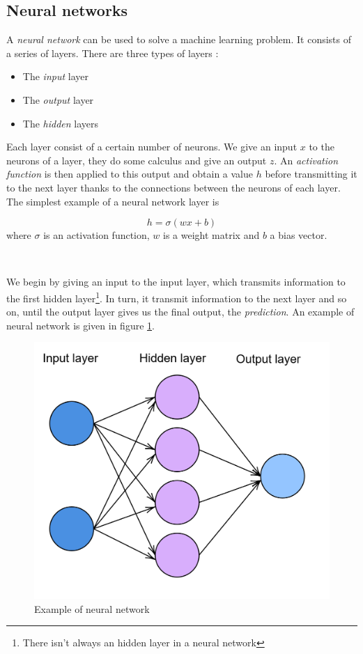 \documentclass[10pt,a4paper]{article}
\theoremstyle{definition}
\theoremstyle{definition}
\theoremstyle{definition}
\begin{document}
\subsection{Neural networks}


\noindent A \textit{neural network} can be used to solve a machine learning problem. It consists of a series of layers. There are three types of layers :

\begin{itemize}
\item The \textit{input} layer
\item The \textit{output} layer
\item The \textit{hidden} layers
\end{itemize}

Each layer consist of a certain number of neurons. We give an input $x$ to the neurons of a layer, they do some calculus and give an output $z$. An \textit{activation function} is then applied to this output and obtain a value $h$ before transmitting it to the next layer thanks to the connections between the neurons of each layer. The simplest example of a neural network layer is 

$$
h = \sigma (wx +b)
$$
where $\sigma$ is an activation function, $w$ is a weight matrix and $b$ a bias vector.

~

We begin by giving an input to the input layer, which transmits information to the first hidden layer\footnote{There isn't always an hidden layer in a neural network}. In turn, it transmit information to the next layer and so on, until the output layer gives us the final output, the \textit{prediction}. An example of neural network is given in figure \ref{examplenn}.

\begin{figure}
\center
\includegraphics[scale=0.2]{nn.png}
\caption{Example of neural network}
\label{examplenn}
\end{figure}
\end{document}
